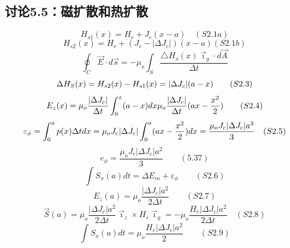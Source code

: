 \subsection{讨论5.5：磁扩散和热扩散}
\begin{equation}%
H_{s1}(x)=H_{e}+J_{c}(x-a)\quad(S2.1a)
\end{equation}
\begin{equation}%
H_{s2}(x)=H_{e}+(J_{c}-| \Delta J_{c}|)(x-a)(S2.1b)
\end{equation}
\begin{equation}%
\oint_{C}\vec{E}\cdot d\vec{s}=-\mu_{o}\int_{S}\frac{\triangle H_{s}(x)\vec{\imath}_{y}\cdot d\vec{A}}{\Delta t}
\end{equation}
\begin{equation}%
\Delta H_{S}(x)=H_{s2}(x)-H_{s1}(x)\\
=|\Delta J_{c}|(a-x)\qquad(S2.3)
\end{equation}
\begin{equation}%
E_{z}(x)=\mu_{o}\frac{|\Delta J_{c}|}{\Delta t}\int_{0}^{x}(a-x)dx\\
\mu_{o}\frac{|\Delta J_{c}|}{\Delta t}(ax-\frac{x^{2}}{2})\qquad(S2.4)
\end{equation}
\begin{equation}%
\varepsilon_{\phi}=\int_{0}^{a}p(x)\Delta tdx\\
=\mu_{o}J_{c}|\Delta J_{c}|\int_{0}^{a}(ax-\frac{x^{2}}{2})dx=\frac{\mu_{o}J_{c}|\Delta J_{c}|a^{3}}{3}\quad(S2.5)
\end{equation}
\begin{equation}%
e_{\phi}=\frac{\mu_{o}J_{c}|\Delta J_{c}|a^{2}}{3}\qquad(5.37)
\end{equation}
\begin{equation}%
\int S_{x}(a)dt=\Delta E_{m}+\varepsilon_{\phi}\qquad(S2.6)
\end{equation}
\begin{equation}%
E_{z}(a)=\mu_{o}\frac{|\Delta J_{c}|a^{2}}{2\Delta t}\qquad(S2.7)
\end{equation}
\begin{equation}%
\vec{S}(a)=\mu_{o}\frac{|\Delta J_{c}|a^{2}}{2\Delta t}\vec{\imath}_{z}\times H_{e}\vec{\imath}_{y}=-\mu_{o}\frac{H_{e}|\Delta J_{c}|a^{2}}{2\Delta t}\quad(S2.8)
\end{equation}
\begin{equation}%
\int S_{x}(a)dt=\mu_{o}\frac{H_{e}|\Delta J_{c}|a^{2}}{2}\qquad(S2.9)
\end{equation}
